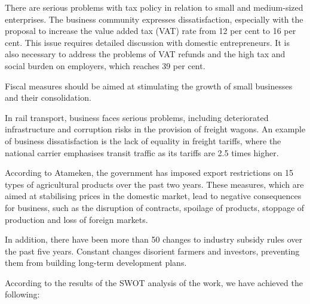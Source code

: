There are serious problems with tax policy in relation to small and
medium-sized enterprises. The business community expresses
dissatisfaction, especially with the proposal to increase the value
added tax (VAT) rate from 12 per cent to 16 per cent. This issue
requires detailed discussion with domestic entrepreneurs. It is also
necessary to address the problems of VAT refunds and the high tax and
social burden on employers, which reaches 39 per cent.

Fiscal measures should be aimed at stimulating the growth of small
businesses and their consolidation.

In rail transport, business faces serious problems, including
deteriorated infrastructure and corruption risks in the provision of
freight wagons. An example of business dissatisfaction is the lack of
equality in freight tariffs, where the national carrier emphasises
transit traffic as its tariffs are 2.5 times higher.

According to Atameken, the government has imposed export restrictions on
15 types of agricultural products over the past two years. These
measures, which are aimed at stabilising prices in the domestic market,
lead to negative consequences for business, such as the disruption of
contracts, spoilage of products, stoppage of production and loss of
foreign markets.

In addition, there have been more than 50 changes to industry subsidy
rules over the past five years. Constant changes disorient farmers and
investors, preventing them from building long-term development plans.

According to the results of the SWOT analysis of the work, we have
achieved the following:

